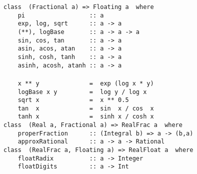 \mbox{\tt class\ \ (Fractional\ a)\ =>\ Floating\ a\ \ where}\\
\mbox{\tt \ \ \ \ pi\ \ \ \ \ \ \ \ \ \ \ \ \ \ \ \ \ \ ::\ a}\\
\mbox{\tt \ \ \ \ exp,\ log,\ sqrt\ \ \ \ \ \ ::\ a\ ->\ a}\\
\mbox{\tt \ \ \ \ (**),\ logBase\ \ \ \ \ \ \ ::\ a\ ->\ a\ ->\ a}\\
\mbox{\tt \ \ \ \ sin,\ cos,\ tan\ \ \ \ \ \ \ ::\ a\ ->\ a}\\
\mbox{\tt \ \ \ \ asin,\ acos,\ atan\ \ \ \ ::\ a\ ->\ a}\\
\mbox{\tt \ \ \ \ sinh,\ cosh,\ tanh\ \ \ \ ::\ a\ ->\ a}\\
\mbox{\tt \ \ \ \ asinh,\ acosh,\ atanh\ ::\ a\ ->\ a}\\
\mbox{\tt }\\[-8pt]
\mbox{\tt \ \ \ \ x\ **\ y\ \ \ \ \ \ \ \ \ \ \ \ \ \ =\ \ exp\ (log\ x\ *\ y)}\\
\mbox{\tt \ \ \ \ logBase\ x\ y\ \ \ \ \ \ \ \ \ =\ \ log\ y\ /\ log\ x}\\
\mbox{\tt \ \ \ \ sqrt\ x\ \ \ \ \ \ \ \ \ \ \ \ \ \ =\ \ x\ **\ 0.5}\\
\mbox{\tt \ \ \ \ tan\ \ x\ \ \ \ \ \ \ \ \ \ \ \ \ \ =\ \ sin\ \ x\ /\ cos\ \ x}\\
\mbox{\tt \ \ \ \ tanh\ x\ \ \ \ \ \ \ \ \ \ \ \ \ \ =\ \ sinh\ x\ /\ cosh\ x}
%
%
%
%
%
%
%
%
%
%
%
%
%
%
%
%
%
%
%
%
\eprogB\noindent\bprogB
\mbox{\tt class\ \ (Real\ a,\ Fractional\ a)\ =>\ RealFrac\ a\ \ where}\\
\mbox{\tt \ \ \ \ properFraction\ \ \ \ \ \ ::\ (Integral\ b)\ =>\ a\ ->\ (b,a)}\\
\mbox{\tt \ \ \ \ approxRational\ \ \ \ \ \ ::\ a\ ->\ a\ ->\ Rational}
%
%
%
%
%
\eprogB\noindent\bprogB
\mbox{\tt class\ \ (RealFrac\ a,\ Floating\ a)\ =>\ RealFloat\ a\ \ where}\\
\mbox{\tt \ \ \ \ floatRadix\ \ \ \ \ \ \ \ \ \ ::\ a\ ->\ Integer}\\
\mbox{\tt \ \ \ \ floatDigits\ \ \ \ \ \ \ \ \ ::\ a\ ->\ Int}\\
